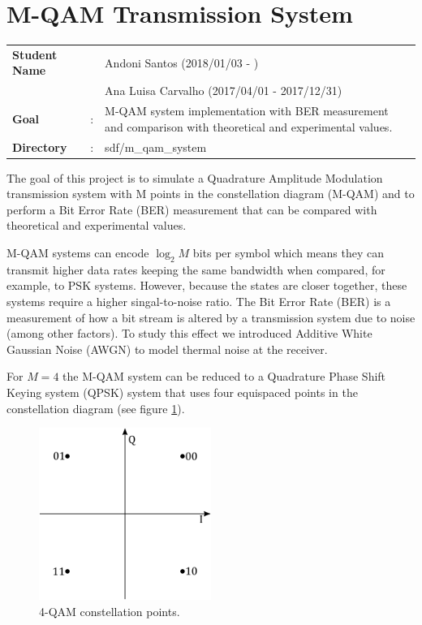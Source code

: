 \clearpage
\section{M-QAM Transmission System}

\begin{tcolorbox}	
	\begin{tabular}{p{2.75cm} p{0.2cm} p{10.5cm}} 	
		\textbf{Student Name}  & & Andoni Santos (2018/01/03 - )\\
							   & & Ana Luisa Carvalho (2017/04/01 - 2017/12/31) \\
		\textbf{Goal}          &:& M-QAM system implementation with BER measurement and comparison with theoretical and experimental values.\\
		\textbf{Directory} &:& sdf/m\_qam\_system
	\end{tabular}
\end{tcolorbox}

The goal of this project is to simulate a Quadrature Amplitude Modulation transmission system with M points in the constellation diagram (M-QAM) and to perform a Bit Error Rate (BER) measurement that can be compared with theoretical and experimental values.

M-QAM systems can encode $\log_2 M$ bits per symbol which means they can transmit higher data rates keeping the same bandwidth when compared, for example, to PSK systems. However, because the states are closer together, these systems require a higher singal-to-noise ratio.
The Bit Error Rate (BER) is a measurement of how a bit stream is altered by a transmission system due to noise (among other factors). To study this effect we introduced Additive White Gaussian Noise (AWGN) to model thermal noise at the receiver.

For $M=4$ the M-QAM system can be reduced to a Quadrature Phase Shift Keying system (QPSK) system that uses four equispaced points in the constellation diagram (see figure \ref{fig:const}).

\begin{figure}[h]
	\centering
	\includegraphics[width=0.5\textwidth]{./sdf/m_qam_system/figures/constellation.pdf}
	\caption{4-QAM constellation points.}
	\label{fig:const}
\end{figure}


